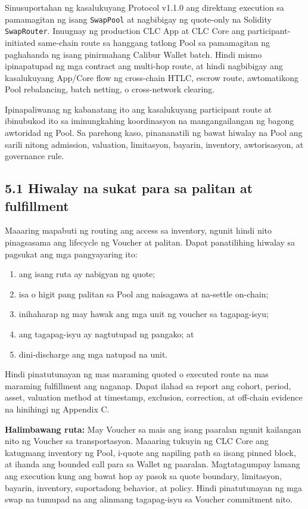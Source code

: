 \documentclass[11pt]{article}
\begin{document}
Sinusuportahan ng kasalukuyang Protocol v1.1.0 ang direktang execution sa pamamagitan ng isang \texttt{SwapPool} at nagbibigay ng quote-only na Solidity \texttt{SwapRouter}. Inuugnay ng production CLC App at CLC Core ang participant-initiated same-chain route sa hanggang tatlong Pool sa pamamagitan ng paghahanda ng isang pinirmahang Calibur Wallet batch. Hindi mismo ipinapatupad ng mga contract ang multi-hop route, at hindi nagbibigay ang kasalukuyang App/Core flow ng cross-chain HTLC, escrow route, awtomatikong Pool rebalancing, batch netting, o cross-network clearing.

Ipinapaliwanag ng kabanatang ito ang kasalukuyang participant route at ibinubukod ito sa iminungkahing koordinasyon na mangangailangan ng bagong awtoridad ng Pool. Sa parehong kaso, pinananatili ng bawat hiwalay na Pool ang sarili nitong admission, valuation, limitasyon, bayarin, inventory, awtorisasyon, at governance rule.

\subsection*{5.1 Hiwalay na sukat para sa palitan at fulfillment}

Maaaring mapabuti ng routing ang access sa inventory, ngunit hindi nito pinagsasama ang lifecycle ng Voucher at palitan. Dapat panatilihing hiwalay sa pagsukat ang mga pangyayaring ito:

\begin{enumerate}[leftmargin=*]
\item ang isang ruta ay nabigyan ng quote;
\item isa o higit pang palitan sa Pool ang naisagawa at na-settle on-chain;
\item inihaharap ng may hawak ang mga unit ng voucher sa tagapag-isyu;
\item ang tagapag-isyu ay nagtutupad ng pangako; at
\item dini-discharge ang mga natupad na unit.
\end{enumerate}
Hindi pinatutunayan ng mas maraming quoted o executed route na mas maraming fulfillment ang naganap. Dapat ilahad sa report ang cohort, period, asset, valuation method at timestamp, exclusion, correction, at off-chain evidence na hinihingi ng Appendix C.

\textbf{Halimbawang ruta:} May Voucher sa mais ang isang paaralan ngunit kailangan nito ng Voucher sa transportasyon. Maaaring tukuyin ng CLC Core ang katugmang inventory ng Pool, i-quote ang napiling path sa iisang pinned block, at ihanda ang bounded call para sa Wallet ng paaralan. Magtatagumpay lamang ang execution kung ang bawat hop ay pasok sa quote boundary, limitasyon, bayarin, inventory, suportadong behavior, at policy. Hindi pinatutunayan ng mga swap na tumupad na ang alinmang tagapag-isyu sa Voucher commitment nito.
\end{document}
